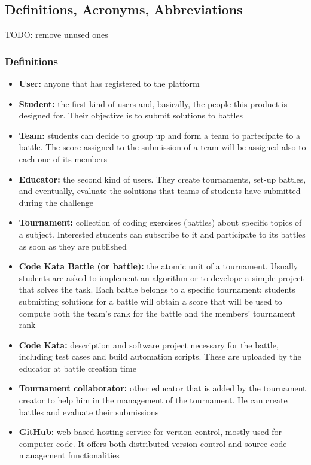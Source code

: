 \subsection{Definitions, Acronyms, Abbreviations}
TODO: remove unused ones

\subsubsection{Definitions}
\begin{itemize}
    \item {\textbf{User:} anyone that has registered to the platform}
    \item {\textbf{Student:} the first kind of users and, basically, the people this product is designed for. Their objective is to submit solutions to battles}
    \item {\textbf{Team:} students can decide to group up and form a team to partecipate to a battle. The score assigned to the submission of a team will be assigned also to each one of its members}
    \item {\textbf{Educator:} the second kind of users. They create tournaments, set-up battles, and eventually, evaluate the solutions that teams of students have submitted during the challenge}
    \item {\textbf{Tournament:} collection of coding exercises (battles) about specific topics of a subject. Interested students can subscribe to it and participate to its battles as soon as they are published}
    \item {\textbf{Code Kata Battle (or battle):} the atomic unit of a tournament. Usually students are asked to implement an algorithm or to develope a simple project that solves the task. Each battle belongs to a specific tournament: students submitting solutions for a battle will obtain a score that will be used to compute both the team's rank for the battle and the members' tournament rank}
    \item {\textbf{Code Kata:} description and software project necessary for the battle, including test cases and build automation scripts. These are uploaded by the educator at battle creation time}
    \item {\textbf{Tournament collaborator:} other educator that is added by the tournament creator to help him in the management of the tournament. He can create battles and evaluate their submissions}
    \item {\textbf{GitHub:} web-based hosting service for version control, mostly used for computer code. It offers both distributed version control and source code management functionalities}

\end{itemize}
